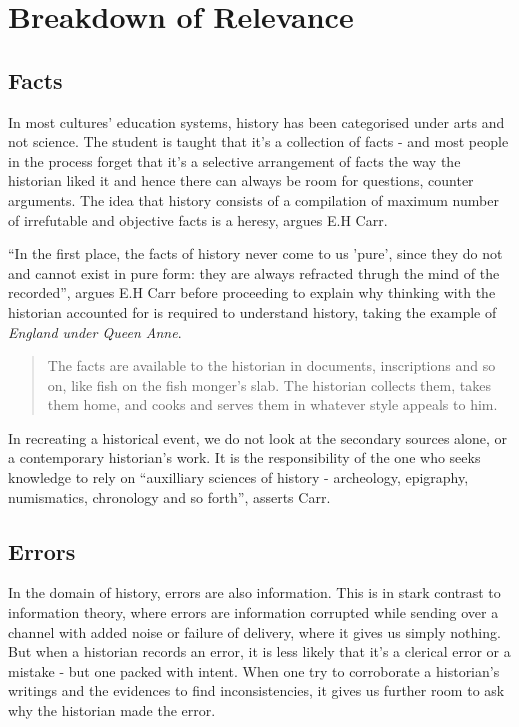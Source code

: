 \documentclass[a4paper]{article}
\begin{document}
\section{Breakdown of Relevance}

\subsection{Facts}

In most cultures' education systems, history has been categorised under
arts and not science. The student is taught that it's a collection of
facts - and most people in the process forget that it's a selective
arrangement of facts the way the historian liked it and hence there can
always be room for questions, counter arguments. The idea that history
consists of a compilation of maximum number of irrefutable and objective
facts is a heresy, argues E.H Carr\cite[p. 15]{carr1961history}.

``In the first place, the facts of history never come to us 'pure',
since they do not and cannot exist in pure form: they are always
refracted thrugh the mind of the recorded'', argues \cite[p.
23]{carr1961history} E.H Carr before proceeding to explain why thinking
with the historian accounted for is required to understand history,
taking the example of \emph{England under Queen Anne}\cite[p.
23]{carr1961history}.

\blockquote{The facts are available to the historian in documents,
    inscriptions and so on, like fish on the fish monger's slab. The
    historian collects them, takes them home, and cooks and serves them
    in whatever style appeals to him. \cite[p.  9]{carr1961history}}

In recreating a historical event, we do not look at the secondary
sources alone, or a contemporary historian's work. It is the
responsibility of the one who seeks knowledge to rely on ``auxilliary
sciences of history - archeology, epigraphy, numismatics, chronology and
so forth'', asserts Carr\cite[p.11]{carr1961history}. 


\subsection{Errors}

In the domain of history, errors are also information. This is in stark
contrast to information theory, where errors are information corrupted
while sending over a channel with added noise or failure of delivery,
where it gives us simply nothing. But when a historian records an error,
it is less likely that it's a clerical error or a mistake - but one
packed with intent. When one try to corroborate a historian's writings
and the evidences to find inconsistencies, it gives us further room to
ask why the historian made the error.
\end{document}
